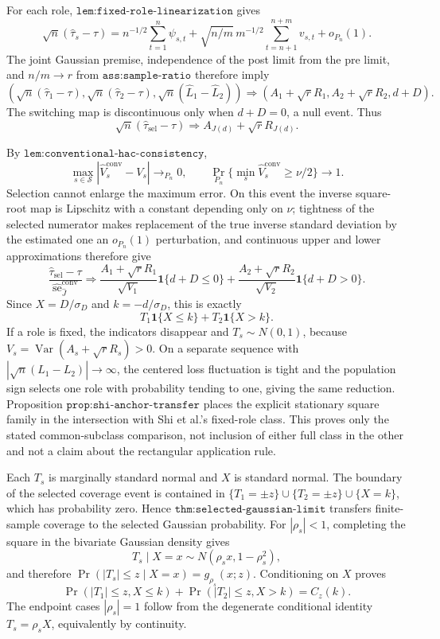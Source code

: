 For each role, \(\texttt{lem:fixed-role-linearization}\) gives
\[
 \sqrt n(\widehat\tau_s-\tau)
 =n^{-1/2}\sum_{t=1}^n\psi_{s,t}
 +\sqrt{n/m}\,m^{-1/2}\sum_{t=n+1}^{n+m}v_{s,t}+o_{P_n}(1).
\]
The joint Gaussian premise, independence of the post limit from the pre limit, and \(n/m\to r\) from \(\texttt{ass:sample-ratio}\) therefore imply
\[
 \left(\sqrt n(\widehat\tau_1-\tau),\sqrt n(\widehat\tau_2-\tau),
 \sqrt n(\widehat L_1-\widehat L_2)\right)
 \Rightarrow(A_1+\sqrt rR_1,A_2+\sqrt rR_2,d+D).
\]
The switching map is discontinuous only when \(d+D=0\), a null event.  Thus
\[
 \sqrt n(\widehat\tau_{\mathrm{sel}}-\tau)
 \Rightarrow A_{J(d)}+\sqrt rR_{J(d)}.
\]

By \(\texttt{lem:conventional-hac-consistency}\),
\[
 \max_{s\in\mathcal S}|\widehat V_s^{\mathrm{conv}}-V_s|\to_{P_n}0,
 \qquad
 \Pr_{P_n}\{\min_s\widehat V_s^{\mathrm{conv}}\geq\nu/2\}\to1.
\]
Selection cannot enlarge the maximum error.  On this event the inverse square-root map is Lipschitz with a constant depending only on \(\nu\); tightness of the selected numerator makes replacement of the true inverse standard deviation by the estimated one an \(o_{P_n}(1)\) perturbation, and continuous upper and lower approximations therefore give
\[
 \frac{\widehat\tau_{\mathrm{sel}}-\tau}
 {\widehat{\operatorname{se}}^{\mathrm{conv}}_{\widehat J}}
 \Rightarrow
 \frac{A_1+\sqrt rR_1}{\sqrt{V_1}}\mathbf1\{d+D\leq0\}
 +\frac{A_2+\sqrt rR_2}{\sqrt{V_2}}\mathbf1\{d+D>0\}.
\]
Since \(X=D/\sigma_D\) and \(k=-d/\sigma_D\), this is exactly
\[
 T_1\mathbf1\{X\leq k\}+T_2\mathbf1\{X>k\}.
\]
If a role is fixed, the indicators disappear and \(T_s\sim N(0,1)\), because \(V_s=\operatorname{Var}(A_s+\sqrt rR_s)>0\).  On a separate sequence with \(|\sqrt n(L_1-L_2)|\to\infty\), the centered loss fluctuation is tight and the population sign selects one role with probability tending to one, giving the same reduction.  Proposition \(\texttt{prop:shi-anchor-transfer}\) places the explicit stationary square family in the intersection with Shi et al.'s fixed-role class.  This proves only the stated common-subclass comparison, not inclusion of either full class in the other and not a claim about the rectangular application rule.

Each \(T_s\) is marginally standard normal and \(X\) is standard normal.  The boundary of the selected coverage event is contained in \(\{T_1=\pm z\}\cup\{T_2=\pm z\}\cup\{X=k\}\), which has probability zero.  Hence \(\texttt{thm:selected-gaussian-limit}\) transfers finite-sample coverage to the selected Gaussian probability.  For \(|\rho_s|<1\), completing the square in the bivariate Gaussian density gives
\[
 T_s\mid X=x\sim N(\rho_sx,1-\rho_s^2),
\]
and therefore \(\Pr(|T_s|\leq z\mid X=x)=g_{\rho_s}(x;z)\).  Conditioning on \(X\) proves
\[
 \Pr(|T_1|\leq z,X\leq k)+\Pr(|T_2|\leq z,X>k)=C_z(k).
\]
The endpoint cases \(|\rho_s|=1\) follow from the degenerate conditional identity \(T_s=\rho_sX\), equivalently by continuity.

